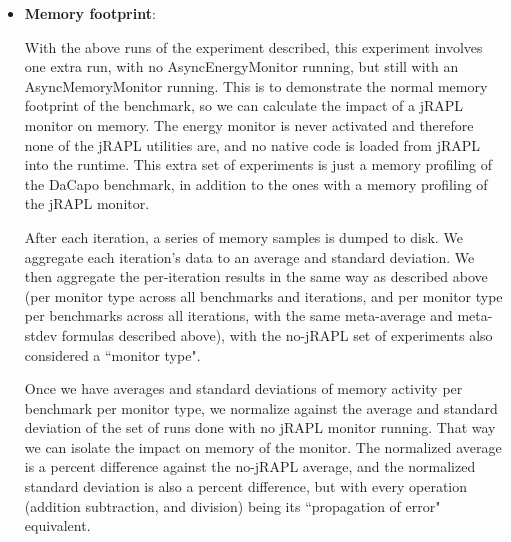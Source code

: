 \begin{itemize}
        \item \textbf{Memory footprint}:
        
        With the above runs of the experiment described, this experiment involves one extra run, with no AsyncEnergyMonitor running, but still with an AsyncMemoryMonitor running. This is to demonstrate the normal memory footprint of the benchmark, so we can calculate the impact of a jRAPL monitor on memory. The energy monitor is never activated and therefore none of the jRAPL utilities are, and no native code is loaded from jRAPL into the runtime. This extra set of experiments is just a memory profiling of the DaCapo benchmark, in addition to the ones with a memory profiling of the jRAPL monitor.
        
        
        After each iteration, a series of memory samples is dumped to disk. We aggregate each iteration's data to an average and standard deviation. We then aggregate the per-iteration results in the same way as described above (per monitor type across all benchmarks and iterations, and per monitor type per benchmarks across all iterations, with the same meta-average and meta-stdev formulas described above), with the no-jRAPL set of experiments also considered a ``monitor type".
        
        Once we have averages and standard deviations of memory activity per benchmark per monitor type, we normalize against the average and standard deviation of the set of runs done with no jRAPL monitor running. That way we can isolate the impact on memory of the monitor. The normalized average is a percent difference against the no-jRAPL average, and the normalized standard deviation is also a percent difference, but with every operation (addition subtraction, and division) being its ``propagation of error" equivalent. 
        
    \end{itemize}